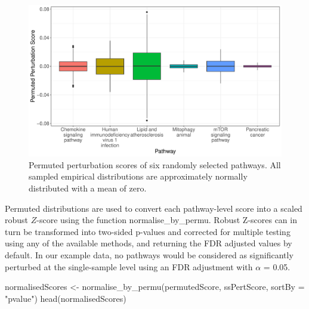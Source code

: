 \documentclass[9pt,a4paper,]{extarticle}
\newenvironment{Shaded}{\begin{snugshade}}{\end{snugshade}}
\newcommand{\AttributeTok}[1]{\textcolor[rgb]{0.77,0.63,0.00}{#1}}
\newcommand{\FunctionTok}[1]{\textcolor[rgb]{0.00,0.00,0.00}{#1}}
\newcommand{\NormalTok}[1]{#1}
\newcommand{\OtherTok}[1]{\textcolor[rgb]{0.56,0.35,0.01}{#1}}
\newcommand{\StringTok}[1]{\textcolor[rgb]{0.31,0.60,0.02}{#1}}
\begin{document}
\begin{figure}

{\centering \includegraphics[width=1\linewidth]{sSNAPPY_paper_files/figure-latex/Figure3-1} 

}

\caption{Permuted perturbation scores of six randomly selected pathways. All sampled empirical distributions are approximately normally distributed with a mean of zero.}\label{fig:Figure3}
\end{figure}

Permuted distributions are used to convert each pathway-level score into a scaled robust \(Z\)-score using the function normalise\_by\_permu.
Robust Z-scores can in turn be transformed into two-sided p-values and corrected for multiple testing using any of the available methods, and returning the FDR adjusted values by default.
In our example data, no pathways would be considered as significantly perturbed at the single-sample level using an FDR adjustment with \(\alpha\) = 0.05.

\begin{Shaded}
\begin{Highlighting}[]
\NormalTok{normalisedScores }\OtherTok{\textless{}{-}} \FunctionTok{normalise\_by\_permu}\NormalTok{(permutedScore, ssPertScore, }
                                       \AttributeTok{sortBy =} \StringTok{"pvalue"}\NormalTok{)}
\FunctionTok{head}\NormalTok{(normalisedScores)}
\end{Highlighting}
\end{Shaded}
\end{document}
